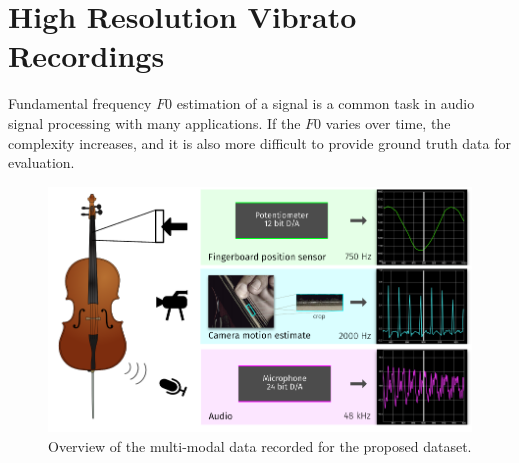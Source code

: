 \section{High Resolution Vibrato Recordings}%
\label{sec:muserc}


Fundamental frequency \(F0\) estimation of a signal is a common task in audio signal processing with many applications. 
If the $F0$ varies over time, the complexity increases, and it is also more difficult to provide ground truth data for evaluation.

\begin{figure}[h]
  \centering
  \includegraphics[width=\textwidth]{Chapters/04_Data/figures/teaser.pdf}
  \caption{Overview of the multi-modal data recorded for the proposed dataset.}
\label{fig:teaser_hdf0}
\end{figure}

